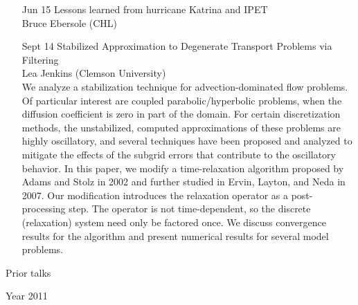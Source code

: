 \documentclass[12]{article}
\begin{document}
\begin{enumerate}

\item[Jun 15]Lessons learned from hurricane Katrina and IPET\\Bruce Ebersole (CHL)\\


\item[Sept 14]Stabilized Approximation to Degenerate Transport Problems via Filtering\\Lea Jenkins (Clemson University)\\
We analyze a stabilization technique for advection-dominated
flow problems.  Of particular interest are coupled parabolic/hyperbolic
problems, when the diffusion coefficient is zero in part of the domain. 
For certain discretization methods, the unstabilized, computed
approximations of these problems are highly oscillatory, and several
techniques have been proposed and analyzed to mitigate the effects of the
subgrid errors that contribute to the oscillatory behavior.  In this
paper, we modify a time-relaxation algorithm proposed by Adams and Stolz
in 2002 and further studied in Ervin, Layton, and Neda in 2007.  Our
modification introduces the relaxation operator as a post-processing step.
The operator is not time-dependent, so the discrete (relaxation) system
need only be factored once.  We discuss convergence results for the
algorithm and present numerical results for several model problems.

\end{enumerate}

\begin{center}
\Large
Prior talks
\end{center}

\begin{center}
\Large
Year 2011
\end{center}
\end{document}
